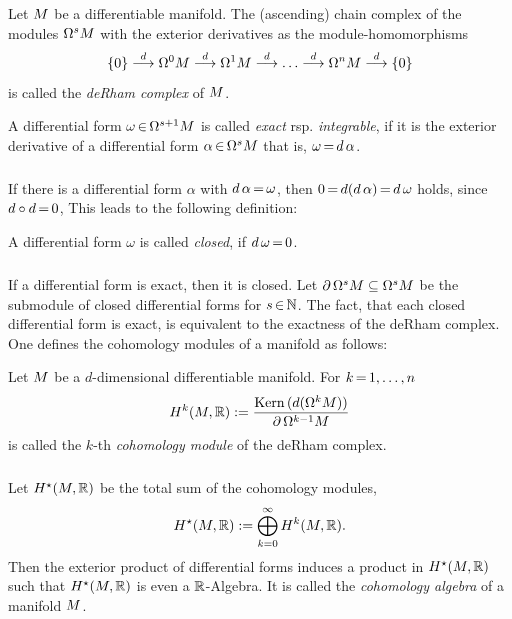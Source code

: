 \documentclass[11pt,twoside]{article}
\begin{document}
\begin{definition}
Let ${M}$ be a differentiable manifold.
The (ascending) chain complex of the modules $\Omega^s {M}$
with the exterior derivatives as the module-homomorphisms
\[
\{0\}
\stackrel{d}{\longrightarrow} \Omega^0 {M}
\stackrel{d}{\longrightarrow} \Omega^1 {M}
\stackrel{d}{\longrightarrow} \ldots
\stackrel{d}{\longrightarrow} \Omega^n {M}
\stackrel{d}{\longrightarrow}
\{0\}
\]
is called the \textit{deRham complex} of ${M}$.
\end{definition}

\begin{definition}
A differential form $\omega {\,\in\,} \Omega^{s+1} {M}$ is called \textit{exact}
rsp. \textit{integrable},
if it is the exterior derivative of a differential form
$\alpha {\,\in\,} \Omega^s {M}$
that is,
$\omega {\,=\,} d \, \alpha$.
\end{definition}

\subparagraph{}
If there is a differential form $\alpha$ with $d \, \alpha {\,=\,} \omega$,
then $0 {\,=\,} d (d \, \alpha) {\,=\,} d \, \omega$ holds,
since $d \circ d {\,=\,} 0$,
This leads to the following definition:

\begin{definition}
A differential form $\omega$ is called \textit{closed},
if $d \, \omega {\,=\,} 0$.
\end{definition}

\subparagraph{}
If a differential form is exact, then it is closed.
Let $\partial \, \Omega^s {M} \subseteq \Omega^s {M}$
be the submodule of closed differential forms for $s {\,\in\,} {\mathbb{N}}$.
The fact, that each closed differential form is exact,
is equivalent to the exactness of the deRham complex.
One defines the cohomology modules of a manifold as follows:

\begin{definition}
Let ${M}$ be a $d$-dimensional differentiable manifold.
For $k {\,=\,} 1,\ldots,n$
\[
H^k({M},{\mathbb{R}}) := \frac
{\operatorname{Kern}\,(d(\Omega^{k} {M}))}
{\partial \, \Omega^{k-1} {M}}
\]
is called the $k$-th \textit{cohomology module} of the deRham complex.
\end{definition}

\subparagraph{}
Let $H^{\star}({M},{\mathbb{R}})$ be the total sum of the cohomology modules,
\[
H^{\star}({M},{\mathbb{R}}) := \bigoplus_{k=0}^{\infty} H^k({M},{\mathbb{R}}).
\]
Then the exterior product of differential forms induces a
product in $H^{\star}({M},{\mathbb{R}})$
such that $H^{\star}({M},{\mathbb{R}})$ is even a ${\mathbb{R}}$-Algebra.
It is called the \textit{cohomology algebra} of a manifold ${M}$.
\end{document}
